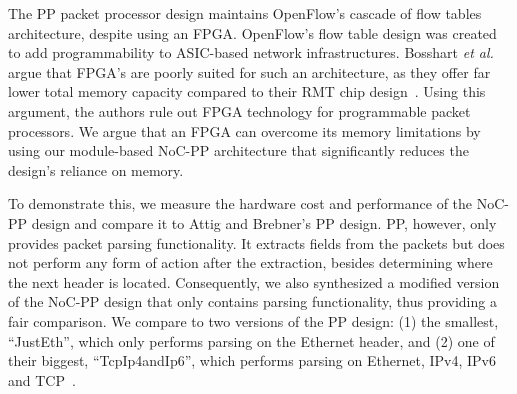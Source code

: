 %
%

The PP packet processor design maintains OpenFlow's cascade of flow tables architecture, despite using an FPGA.
OpenFlow's flow table design was created to add programmability to ASIC-based network infrastructures.
Bosshart \textit{et al.} argue that FPGA's are poorly suited for such an architecture, as they offer far lower total memory capacity compared to their RMT chip design~\citep{bosshart2013forwarding}.
Using this argument, the authors rule out FPGA technology for programmable packet processors.
We argue that an FPGA can overcome its memory limitations by using our module-based NoC-PP architecture that significantly reduces the design's reliance on memory.

To demonstrate this, we measure the hardware cost and performance of the NoC-PP design and compare it to Attig and Brebner's PP design.
PP, however, only provides packet parsing functionality.
It extracts fields from the packets but does not perform any form of action after the extraction, besides determining where the next header is located.
Consequently, we also synthesized a modified version of the NoC-PP design that only contains parsing functionality, thus providing a fair comparison.
We compare to two versions of the PP design: (1) the smallest, ``JustEth'', which only performs parsing on the Ethernet header, and (2) one of their biggest, ``TcpIp4andIp6'', which performs parsing on Ethernet, IPv4, IPv6 and TCP~\cite{attig2011400}.


